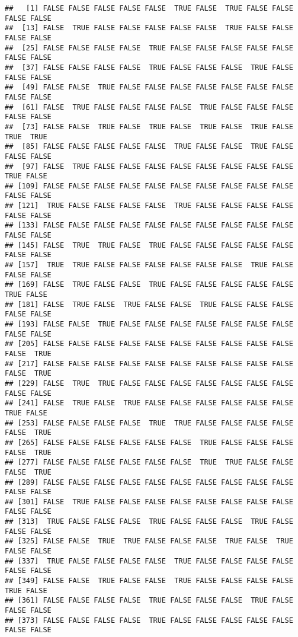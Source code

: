 \documentclass[
]{book}
\begin{document}
\begin{verbatim}
##   [1] FALSE FALSE FALSE FALSE FALSE  TRUE FALSE  TRUE FALSE FALSE FALSE FALSE
##  [13] FALSE  TRUE FALSE FALSE FALSE FALSE FALSE  TRUE FALSE FALSE FALSE FALSE
##  [25] FALSE FALSE FALSE FALSE  TRUE FALSE FALSE FALSE FALSE FALSE FALSE FALSE
##  [37] FALSE FALSE FALSE FALSE  TRUE FALSE FALSE FALSE  TRUE FALSE FALSE FALSE
##  [49] FALSE FALSE  TRUE FALSE FALSE FALSE FALSE FALSE FALSE FALSE FALSE FALSE
##  [61] FALSE  TRUE FALSE FALSE FALSE FALSE  TRUE FALSE FALSE FALSE FALSE FALSE
##  [73] FALSE FALSE  TRUE FALSE  TRUE FALSE  TRUE FALSE  TRUE FALSE  TRUE  TRUE
##  [85] FALSE FALSE FALSE FALSE FALSE  TRUE FALSE FALSE  TRUE FALSE FALSE FALSE
##  [97] FALSE  TRUE FALSE FALSE FALSE FALSE FALSE FALSE FALSE FALSE  TRUE FALSE
## [109] FALSE FALSE FALSE FALSE FALSE FALSE FALSE FALSE FALSE FALSE FALSE FALSE
## [121]  TRUE FALSE FALSE FALSE FALSE  TRUE FALSE FALSE FALSE FALSE FALSE FALSE
## [133] FALSE FALSE FALSE FALSE FALSE FALSE FALSE FALSE FALSE FALSE FALSE FALSE
## [145] FALSE  TRUE  TRUE FALSE  TRUE FALSE FALSE FALSE FALSE FALSE FALSE FALSE
## [157]  TRUE  TRUE FALSE FALSE FALSE FALSE FALSE FALSE  TRUE FALSE FALSE FALSE
## [169] FALSE  TRUE FALSE FALSE  TRUE FALSE FALSE FALSE FALSE FALSE  TRUE FALSE
## [181] FALSE  TRUE FALSE  TRUE FALSE FALSE  TRUE FALSE FALSE FALSE FALSE FALSE
## [193] FALSE FALSE  TRUE FALSE FALSE FALSE FALSE FALSE FALSE FALSE FALSE FALSE
## [205] FALSE FALSE FALSE FALSE FALSE FALSE FALSE FALSE FALSE FALSE FALSE  TRUE
## [217] FALSE FALSE FALSE FALSE FALSE FALSE FALSE FALSE FALSE FALSE FALSE  TRUE
## [229] FALSE  TRUE  TRUE FALSE FALSE FALSE FALSE FALSE FALSE FALSE FALSE FALSE
## [241] FALSE  TRUE FALSE  TRUE FALSE FALSE FALSE FALSE FALSE FALSE  TRUE FALSE
## [253] FALSE FALSE FALSE FALSE  TRUE  TRUE FALSE FALSE FALSE FALSE FALSE  TRUE
## [265] FALSE FALSE FALSE FALSE FALSE FALSE  TRUE FALSE FALSE FALSE FALSE  TRUE
## [277] FALSE FALSE FALSE FALSE FALSE FALSE  TRUE  TRUE FALSE FALSE FALSE  TRUE
## [289] FALSE FALSE FALSE FALSE FALSE FALSE FALSE FALSE FALSE FALSE FALSE FALSE
## [301] FALSE  TRUE FALSE FALSE FALSE FALSE FALSE FALSE FALSE FALSE FALSE FALSE
## [313]  TRUE FALSE FALSE FALSE  TRUE FALSE FALSE FALSE  TRUE FALSE FALSE FALSE
## [325] FALSE FALSE  TRUE  TRUE FALSE FALSE FALSE  TRUE FALSE  TRUE FALSE FALSE
## [337]  TRUE FALSE FALSE FALSE FALSE  TRUE FALSE FALSE FALSE FALSE FALSE FALSE
## [349] FALSE FALSE  TRUE FALSE FALSE  TRUE FALSE FALSE FALSE FALSE  TRUE FALSE
## [361] FALSE FALSE FALSE FALSE  TRUE FALSE FALSE FALSE  TRUE FALSE FALSE FALSE
## [373] FALSE FALSE FALSE FALSE  TRUE FALSE FALSE FALSE FALSE FALSE FALSE FALSE

\end{verbatim}
\end{document}
